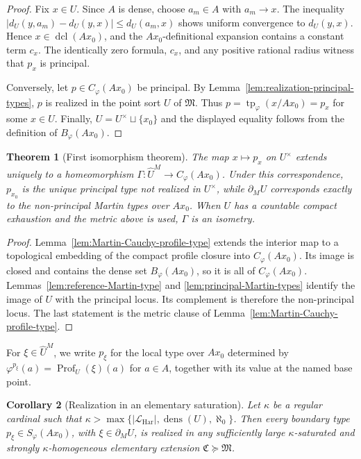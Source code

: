 \documentclass{amsart}
\newtheorem{theorem}{Theorem}[section]
\newtheorem{corollary}[theorem]{Corollary}
\theoremstyle{definition}
\theoremstyle{remark}
\numberwithin{equation}{section}
\begin{document}
\begin{proof}
	Fix $x\in U$. Since $A$ is dense, choose $a_m\in A$ with $a_m\to x$.
	The inequality
	$|d_U(y,a_m)-d_U(y,x)|\le d_U(a_m,x)$ shows uniform convergence to
	$d_U(y,x)$. Hence $x\in\operatorname{dcl}(Ax_0)$, and the
	$Ax_0$-definitional expansion contains a constant term $c_x$. The
	identically zero formula, $c_x$, and any positive rational radius
	witness that $p_x$ is principal.
	
	Conversely, let $p\in C_\varphi(Ax_0)$ be principal. By
	Lemma~\ref{lem:realization-principal-types}, $p$ is realized in the
	point sort $U$ of $\mathfrak M$. Thus
	$p=\operatorname{tp}_\varphi(x/Ax_0)=p_x$ for some $x\in U$. Finally,
	$U=U^\times\sqcup\{x_0\}$ and the displayed equality follows from the
	definition of $B_\varphi(Ax_0)$.
\end{proof}

\begin{theorem}[First isomorphism theorem]
	\label{thm:global-Martin-profile-correspondence}
	The map $x\mapsto p_x$ on $U^\times$ extends uniquely to a
	homeomorphism
	$\Gamma:\widehat U^{M}\to C_\varphi(Ax_0)$. Under this
	correspondence, $p_{x_0}$ is the unique principal type not realized in $U^\times$, while $\partial_MU$
	corresponds exactly to the non-principal Martin types over $Ax_0$.
	When $U$ has a countable compact exhaustion and the metric above is used, $\Gamma$ is an isometry.
\end{theorem}

\begin{proof}
	Lemma~\ref{lem:Martin-Cauchy-profile-type} extends the interior map to a topological embedding of the compact profile closure into $C_\varphi(Ax_0)$. Its image is closed and contains the dense set $B_\varphi(Ax_0)$, so it is all of $C_\varphi(Ax_0)$. Lemmas~\ref{lem:reference-Martin-type} and \ref{lem:principal-Martin-types} identify the image of $U$ with the principal locus. Its complement is therefore the non-principal locus. The last statement is the metric clause of Lemma~\ref{lem:Martin-Cauchy-profile-type}.
\end{proof}

For $\xi\in\widehat U^{M}$, we write $p_\xi$ for the local type over $Ax_0$ determined by $\varphi^{p_\xi}(a)=\operatorname{Prof}_{U}(\xi)(a)$ for $a\in A$, together with its value at the named base point.



\begin{corollary}[Realization in an elementary saturation]
	\label{thm:saturated-Martin-realization}
	Let $\kappa$ be a regular cardinal such that
	$\kappa>\max\{|\mathcal L_{\mathrm{Har}}|,\operatorname{dens}(U),\aleph_0\}$.
	Then every boundary type $p_\xi\in S_\varphi(Ax_0)$, with
	$\xi\in\partial_MU$, is realized in any sufficiently large
	$\kappa$-saturated and strongly $\kappa$-homogeneous elementary
	extension $\mathfrak C\succeq\mathfrak M$.
\end{corollary}
\end{document}
